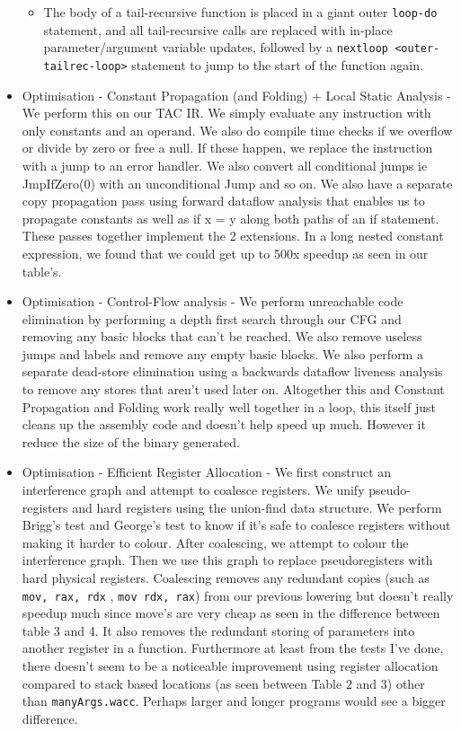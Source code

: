 \documentclass[11pt,a4paper]{article}
\begin{document}
\begin{itemize}[leftmargin=*]
{\begin{itemize}[leftmargin=*]
      \item The body of a tail-recursive function is placed in a giant outer \texttt{loop-do} statement, and all tail-recursive calls are replaced with in-place parameter/argument variable updates, followed by a \texttt{nextloop <outer-tailrec-loop>} statement to jump to the start of the function again.
    \end{itemize}}
  \item Optimisation - Constant Propagation (and Folding) + Local Static Analysis - We perform this on our TAC IR. We simply evaluate any instruction with only constants and an operand. We also do compile time checks if we overflow or divide by zero or free a null. If these happen, we replace the instruction with a jump to an error handler. We also convert all conditional jumps ie JmpIfZero(0) with an unconditional Jump and so on. We also have a separate copy propagation pass using forward dataflow analysis that enables us to propagate constants as well as if x = y along both paths of an if statement. These passes together implement the 2 extensions. In a long nested constant expression, we found that we could get up to 500x speedup as seen in our table's.
  \item Optimisation - Control-Flow analysis - We perform unreachable code elimination by performing a depth first search through our CFG and removing any basic blocks that can't be reached. We also remove useless jumps and labels and remove any empty basic blocks. We also perform a separate dead-store elimination using a backwards dataflow liveness analysis to remove any stores that aren't used later on. Altogether this and Constant Propagation and Folding work really well together in a loop, this itself just cleans up the assembly code and doesn't help speed up much. However it reduce the size of the binary generated.
  \item Optimisation - Efficient Register Allocation - We first construct an interference graph and attempt to coalesce registers. We unify pseudo-registers and hard registers using the union-find data structure. We perform Brigg's test and George's test to know if it's safe to coalesce registers without making it harder to colour. After coalescing, we attempt to colour the interference graph. Then we use this graph to replace pseudoregisters with hard physical registers. Coalescing removes any redundant copies (such as \texttt{mov, rax, rdx} , \texttt{mov rdx, rax}) from our previous lowering but doesn't really speedup much since move's are very cheap as seen in the difference between table 3 and 4. It also removes the redundant storing of parameters into another register in a function. Furthermore at least from the tests I've done, there doesn't seem to be a noticeable improvement using register allocation compared to stack based locations (as seen between Table 2 and 3) other than \texttt{manyArgs.wacc}. Perhaps larger and longer programs would see a bigger difference.
\end{itemize}
\end{document}
